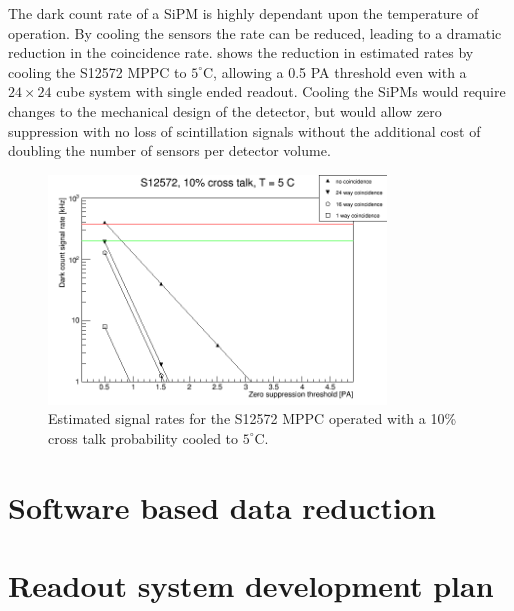 \documentclass[a4paper]{article}
\begin{document}
The dark count rate of a SiPM is highly dependant upon the temperature of operation.
By cooling the sensors the rate can be reduced, leading to a dramatic reduction in the coincidence rate.
 shows the reduction in estimated rates by cooling the S12572 MPPC to $5^{\circ}$C, allowing a 0.5 PA threshold even with a $24\times24$ cube system with single ended readout.
Cooling the SiPMs would require changes to the mechanical design of the detector, but would allow zero suppression with no loss of scintillation signals without the additional cost of doubling the number of sensors per detector volume.

\begin{figure}[hp]
    \begin{center}
        \includegraphics[width=0.8\textwidth]{imgs/g_s12572_10pct_5C}
        \caption{Estimated signal rates for the S12572 MPPC operated with a 10\% cross talk probability cooled to $5^{\circ}$C.}
        \label{rates_s12572_10pct_5C}
    \end{center}
\end{figure}

\section{Software based data reduction}

\section{Readout system development plan}
\end{document}
